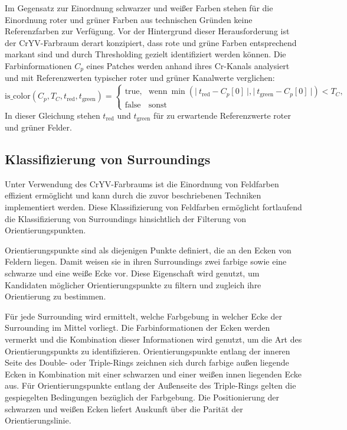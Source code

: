 Im Gegensatz zur Einordnung schwarzer und weißer Farben stehen für die Einordnung roter und grüner Farben aus technischen Gründen keine Referenzfarben zur Verfügung. Vor der Hintergrund dieser Herausforderung ist der CrYV-Farbraum derart konzipiert, dass rote und grüne Farben entsprechend markant sind und durch Thresholding gezielt identifiziert werden können. Die Farbinformationen $C_p$ eines Patches werden anhand ihres Cr-Kanals analysiert und mit Referenzwerten typischer roter und grüner Kanalwerte verglichen:
\begin{equation*}
    \text{is\_color}(C_p, T_C, t_\text{red}, t_\text{green}) =
    \begin{cases}
        \text{true}, & \text{wenn} ~\min\left( \vert~ t_\text{red} - C_p[0] ~\vert, \vert~ t_\text{green} - C_p[0]~\vert \right) < T_C, \\
        \text{false} & \text{sonst}
    \end{cases}
\end{equation*}
In dieser Gleichung stehen $t_\text{red}$ und $t_\text{green}$ für zu erwartende Referenzwerte roter und grüner Felder.


\subsection{Klassifizierung von Surroundings}
\label{sec:surroundings_impl}

Unter Verwendung des CrYV-Farbraums ist die Einordnung von Feldfarben effizient ermöglicht und kann durch die zuvor beschriebenen Techniken implementiert werden. Diese Klassifizierung von Feldfarben ermöglicht fortlaufend die Klassifizierung von Surroundings hinsichtlich der Filterung von Orientierungspunkten.

Orientierungspunkte sind als diejenigen Punkte definiert, die an den Ecken von Feldern liegen. Damit weisen sie in ihren Surroundings zwei farbige sowie eine schwarze und eine weiße Ecke vor. Diese Eigenschaft wird genutzt, um Kandidaten möglicher Orientierungspunkte zu filtern und zugleich ihre Orientierung zu bestimmen.

Für jede Surrounding wird ermittelt, welche Farbgebung in welcher Ecke der Surrounding im Mittel vorliegt. Die Farbinformationen der Ecken werden vermerkt und die Kombination dieser Informationen wird genutzt, um die Art des Orientierungspunkts zu identifizieren. Orientierungspunkte entlang der inneren Seite des Double- oder Triple-Rings zeichnen sich durch farbige außen liegende Ecken in Kombination mit einer schwarzen und einer weißen innen liegenden Ecke aus. Für Orientierungspunkte entlang der Außenseite des Triple-Rings gelten die gespiegelten Bedingungen bezüglich der Farbgebung. Die Positionierung der schwarzen und weißen Ecken liefert Auskunft über die Parität der Orientierungslinie.

